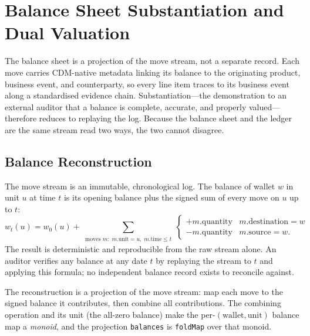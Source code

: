 \section{Balance Sheet Substantiation and Dual Valuation}
\label{sec:sec10}\label{sec:substantiation}

The balance sheet is a projection of the move stream, not a separate record. Each move carries CDM-native metadata linking its balance to the originating product, business event, and counterparty, so every line item traces to its business event along a standardised evidence chain. Substantiation---the demonstration to an external auditor that a balance is complete, accurate, and properly valued---therefore reduces to replaying the log. Because the balance sheet and the ledger are the same stream read two ways, the two cannot disagree.

\subsection{Balance Reconstruction}

The move stream is an immutable, chronological log. The balance of wallet $w$ in unit $u$ at time $t$ is its opening balance plus the signed sum of every move on $u$ up to $t$:
\[
w_t(u) = w_0(u) + \sum_{\substack{\text{moves } m:\; m.\text{unit}=u,\; m.\text{time}\leq t}}
\begin{cases}
+m.\text{quantity} & m.\text{destination}=w \\
-m.\text{quantity} & m.\text{source}=w.
\end{cases}
\]
The result is deterministic and reproducible from the raw stream alone. An auditor verifies any balance at any date $t$ by replaying the stream to $t$ and applying this formula; no independent balance record exists to reconcile against.

The reconstruction is a projection of the move stream: map each move to the signed balance it contributes, then combine all contributions. The combining operation and its unit (the all-zero balance) make the per-$(\text{wallet},\text{unit})$ balance map a \emph{monoid}, and the projection \lstinline!balances! is \lstinline!foldMap! over that monoid.

